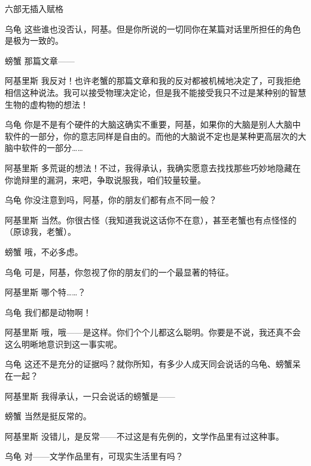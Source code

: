 \begin{dialog}{六部无插入赋格}
\begin{dialogue}
\item[乌龟]这些谁也没否认，阿基。但是你所说的一切同你在某篇对话里所担任的角色是极为一致的。

\item[螃蟹]那篇文章——

\item[阿基里斯]我反对！也许老蟹的那篇文章和我的反对都被机械地决定了，可我拒绝相信这种说法。我可以接受物理决定论，但是我不能接受我只不过是某种别的智慧生物的虚构物的想法！

\item[乌龟]你是不是有个硬件的大脑这确实不重要，阿基，如果你的大脑是别人大脑中软件的一部分，你的意志同样是自由的。而他的大脑说不定也是某种更高层次的大脑中软件的一部分……

\item[阿基里斯]多荒诞的想法！不过，我得承认，我确实愿意去找找那些巧妙地隐藏在你诡辩里的漏洞，来吧，争取说服我，咱们较量较量。

\item[乌龟]你没注意到吗，阿基，你的朋友们都有点不同一般？

\item[阿基里斯]当然。你很古怪（我知道我说这话你不在意），甚至老蟹也有点怪怪的（原谅我，老蟹）。

\item[螃蟹]哦，不必多虑。

\item[乌龟]可是，阿基，你忽视了你的朋友们的一个最显著的特征。

\item[阿基里斯]哪个特……？

\item[乌龟]我们都是动物啊！

\item[阿基里斯]哦，哦——是这样。你们个个儿都这么聪明。你要是不说，我还真不会这么明晰地意识到这一事实呢。

\item[乌龟]这还不是充分的证据吗？就你所知，有多少人成天同会说话的乌龟、螃蟹呆在一起？

\item[阿基里斯]我得承认，一只会说话的螃蟹是——

\item[螃蟹]当然是挺反常的。

\item[阿基里斯]没错儿，是反常——不过这是有先例的，文学作品里有过这种事。

\item[乌龟]对——文学作品里有，可现实生活里有吗？


\end{dialogue}
\end{dialog}
